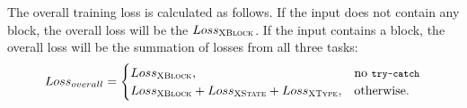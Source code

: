 The overall training loss is calculated as follows. If the input does
not contain any  block, the overall loss will be the 
$Loss_{{\textsc{XBlock}}}$. If the input contains a  block,
the overall loss will be the summation of losses from all
three tasks:
\begin{equation}
\label{eqn:loss}
Loss_{overall} =
\begin{cases}
Loss_{{\textsc{XBlock}}},  & \text{no {\footnotesize\texttt{try-catch}}}\\
Loss_{{\textsc{XBlock}}} + Loss_{{\textsc{XState}}} + Loss_{{\textsc{XType}}}, &\text{otherwise.}
\end{cases}
\end{equation}
